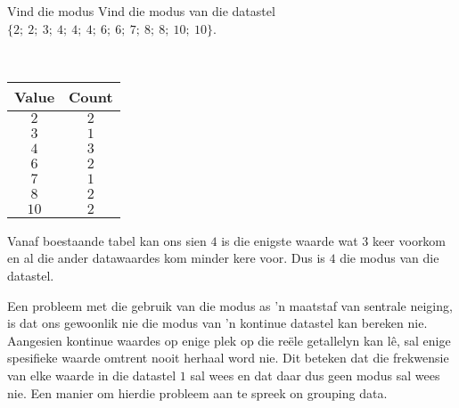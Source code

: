 \begin{wex}{Vind die modus}
{Vind die modus van die datastel $\{2;\ 2;\ 3;\ 4;\ 4;\ 4;\ 6;\ 6;\ 7;\ 8;\ 8;\ 10;\ 10\}$.}
{
\\
  \begin{center}
    \begin{tabular}{|c|c|} \hline
      \textbf{Value} & \textbf{Count} \\ \hline

      $2$ & $2$ \\ \hline
      $3$ & $1$ \\\hline 
      $4$ & $3$ \\\hline
      $6$ & $2$ \\\hline
      $7$ & $1$ \\\hline
      $8$ & $2$ \\\hline
      $10$ & $2$ \\\hline

    \end{tabular}
  \end{center}


  Vanaf boestaande tabel kan ons sien $4$ is die enigste waarde wat $3$ keer voorkom en al die ander datawaardes kom minder kere voor. Dus is $4$ die modus van die datastel.
}
\end{wex}

Een probleem met die gebruik van die modus as ’n maatstaf van sentrale neiging, is dat ons gewoonlik nie die modus van ’n kontinue datastel kan bereken nie. Aangesien kontinue waardes op enige plek op die reële getallelyn kan lê, sal enige spesifieke waarde omtrent nooit herhaal word nie. Dit beteken dat die frekwensie van elke waarde in die datastel $1$ sal wees en dat daar dus geen modus sal wees nie. Een manier om hierdie probleem aan te spreek 
on grouping data.

